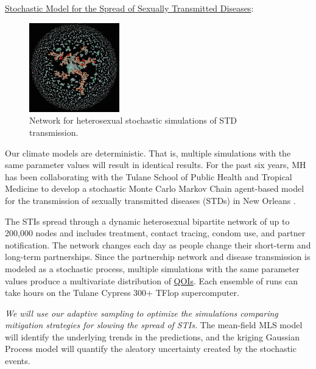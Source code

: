 \documentclass[11pt]{NSFamsart}
\newcommand{\Upara}[1]{\noindent\underline{\upshape #1}:}
\newcommand{\QOIs}{\hyperlink{QOIlink}{QOIs}\xspace}
\begin{document}
\Upara{Stochastic Model for the Spread of Sexually Transmitted Diseases} 

\begin{figure}
\begin{center}
\includegraphics[width = 0.35\textwidth]{ProgramsImages/sexualNetworkNOLA}
\end{center}
\caption{Network for heterosexual stochastic simulations of STD transmission.}
\label{netmodel}
\end{figure}
Our climate models are deterministic.  
That is, multiple simulations with the same parameter values will result in identical results. 
For the past six years, MH has been collaborating with the Tulane School of 
Public Health and Tropical Medicine to develop a stochastic Monte Carlo Markov Chain agent-based model for the transmission of sexually transmitted diseases (STDs) in New Orleans \cite{azizi2016multi,azizi2018using,chowell2016mathematical}. 



The STIs spread through a dynamic heterosexual bipartite network of up to 200,000 nodes and includes treatment, contact tracing, condom use, and partner notification. The network changes each day as people change their short-term and long-term partnerships. 
Since the partnership network and disease transmission is modeled as a stochastic process, multiple simulations with the same parameter values produce a multivariate distribution of \QOIs. Each ensemble of runs can take hours on the Tulane Cypress 300+ TFlop supercomputer. 

\emph{We will use our adaptive sampling to optimize the simulations comparing mitigation strategies for slowing the spread of STIs.} 
The mean-field MLS model will identify the underlying trends in the predictions, and the kriging Gaussian Process model will quantify the aleatory uncertainty created by the stochastic events.


\end{document}
